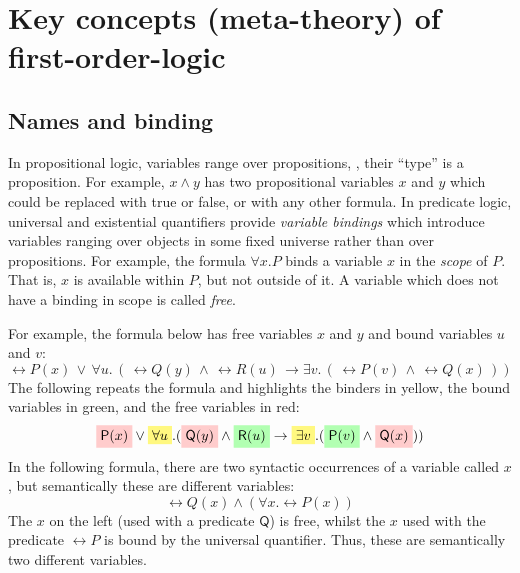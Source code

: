 \section{Key concepts (meta-theory) of first-order-logic}

\subsection{Names and binding}

In propositional logic, variables range over propositions, \ie{},
their ``type'' is a proposition. For example, $x \wedge y$ has two
propositional variables $x$ and $y$ which could be replaced with true
or false, or with any other formula. In predicate logic, universal and
existential quantifiers provide \emph{variable bindings} which
introduce variables ranging over objects in some fixed universe rather than
over propositions. For example, the formula $\forall x . P$ binds
a variable $x$ in the \emph{scope} of $P$. That is, $x$
is available within $P$, but not outside of it. A variable which does
not have a binding in scope is called \emph{free}.

For example, the formula below has free variables $x$ and $y$
and bound variables $u$ and $v$:
%
\begin{equation*}
\rel{P}(x) \, \vee  \, \forall u . \, (\, \rel{Q}(y) \, \wedge \,
\rel{R}(u) \, \rightarrow \exists v . \, (\, \rel{P}(v) \, \wedge \, \rel{Q}(x) \,))
\end{equation*}
%
The following repeats the formula and
highlights the binders in yellow, the bound variables
in green, and the free variables in red:
%
\begin{equation*}
\highlightR{\rel{P}(x)} \vee \highlight{\forall u} . (\highlightR{\rel{Q}(y)} \wedge \highlightG{\rel{R}(u)}
\rightarrow \highlight{\exists v} .
(\highlightG{\rel{P}(v)} \wedge \highlightR{\rel{Q}(x)}))
\end{equation*}
%
%
In the following formula, there are two syntactic occurrences of a
variable called $x$, but semantically these are different variables:
%
\begin{equation*}
\rel{Q}(x) \wedge (\forall x . \rel{P}(x))
\end{equation*}
%
The $x$ on the left (used with a predicate $\mathsf{Q}$) is free,
whilst the $x$ used with the predicate $\rel{P}$ is bound by the
universal quantifier. Thus, these are semantically two different
variables.

